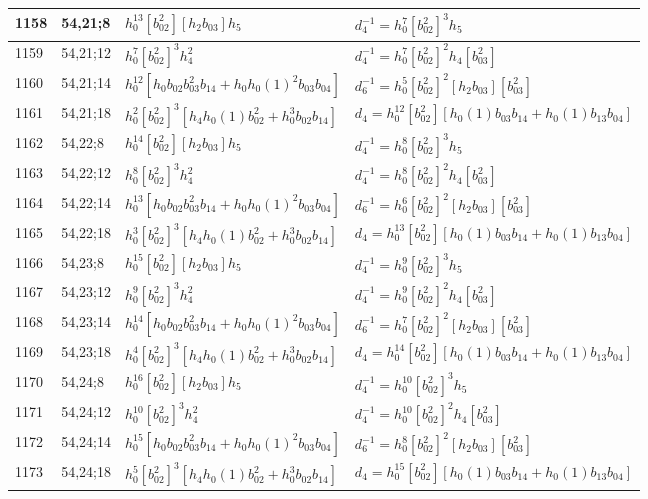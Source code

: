 \documentclass{article}
\begin{document}
\begin{longtable}{|l|l|>{\raggedright\arraybackslash}p{6cm}|>{\raggedright\arraybackslash}p{6cm}|}
\hline
1158 & 54,21;8 & $h_0^{13}[b_{02}^2][h_2b_{03}]h_5$ & $d_{4}^{-1}=h_0^7[b_{02}^2]^3h_5$\\
\hline
1159 & 54,21;12 & $h_0^7[b_{02}^2]^3h_4^2$ & $d_{4}^{-1}=h_0^7[b_{02}^2]^2h_4[b_{03}^2]$\\
\hline
1160 & 54,21;14 & $h_0^{12}[h_0b_{02}b_{03}^2b_{14} + h_0h_0(1)^2b_{03}b_{04}]$ & $d_{6}^{-1}=h_0^5[b_{02}^2]^2[h_2b_{03}][b_{03}^2]$\\
\hline
1161 & 54,21;18 & $h_0^2[b_{02}^2]^3[h_4h_0(1)b_{02}^2 + h_0^3b_{02}b_{14}]$ &$d_{4}=h_0^{12}[b_{02}^2][h_0(1)b_{03}b_{14} + h_0(1)b_{13}b_{04}]$\\
\hline
1162 & 54,22;8 & $h_0^{14}[b_{02}^2][h_2b_{03}]h_5$ & $d_{4}^{-1}=h_0^8[b_{02}^2]^3h_5$\\
\hline
1163 & 54,22;12 & $h_0^8[b_{02}^2]^3h_4^2$ & $d_{4}^{-1}=h_0^8[b_{02}^2]^2h_4[b_{03}^2]$\\
\hline
1164 & 54,22;14 & $h_0^{13}[h_0b_{02}b_{03}^2b_{14} + h_0h_0(1)^2b_{03}b_{04}]$ & $d_{6}^{-1}=h_0^6[b_{02}^2]^2[h_2b_{03}][b_{03}^2]$\\
\hline
1165 & 54,22;18 & $h_0^3[b_{02}^2]^3[h_4h_0(1)b_{02}^2 + h_0^3b_{02}b_{14}]$ &$d_{4}=h_0^{13}[b_{02}^2][h_0(1)b_{03}b_{14} + h_0(1)b_{13}b_{04}]$\\
\hline
1166 & 54,23;8 & $h_0^{15}[b_{02}^2][h_2b_{03}]h_5$ & $d_{4}^{-1}=h_0^9[b_{02}^2]^3h_5$\\
\hline
1167 & 54,23;12 & $h_0^9[b_{02}^2]^3h_4^2$ & $d_{4}^{-1}=h_0^9[b_{02}^2]^2h_4[b_{03}^2]$\\
\hline
1168 & 54,23;14 & $h_0^{14}[h_0b_{02}b_{03}^2b_{14} + h_0h_0(1)^2b_{03}b_{04}]$ & $d_{6}^{-1}=h_0^7[b_{02}^2]^2[h_2b_{03}][b_{03}^2]$\\
\hline
1169 & 54,23;18 & $h_0^4[b_{02}^2]^3[h_4h_0(1)b_{02}^2 + h_0^3b_{02}b_{14}]$ &$d_{4}=h_0^{14}[b_{02}^2][h_0(1)b_{03}b_{14} + h_0(1)b_{13}b_{04}]$\\
\hline
1170 & 54,24;8 & $h_0^{16}[b_{02}^2][h_2b_{03}]h_5$ & $d_{4}^{-1}=h_0^{10}[b_{02}^2]^3h_5$\\
\hline
1171 & 54,24;12 & $h_0^{10}[b_{02}^2]^3h_4^2$ & $d_{4}^{-1}=h_0^{10}[b_{02}^2]^2h_4[b_{03}^2]$\\
\hline
1172 & 54,24;14 & $h_0^{15}[h_0b_{02}b_{03}^2b_{14} + h_0h_0(1)^2b_{03}b_{04}]$ & $d_{6}^{-1}=h_0^8[b_{02}^2]^2[h_2b_{03}][b_{03}^2]$\\
\hline
1173 & 54,24;18 & $h_0^5[b_{02}^2]^3[h_4h_0(1)b_{02}^2 + h_0^3b_{02}b_{14}]$ &$d_{4}=h_0^{15}[b_{02}^2][h_0(1)b_{03}b_{14} + h_0(1)b_{13}b_{04}]$\\

\end{longtable}
\end{document}
